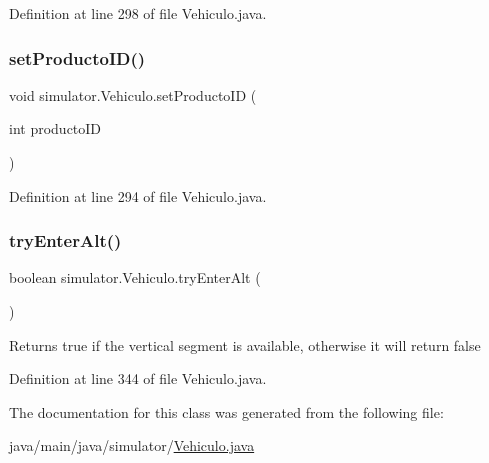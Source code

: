 Definition at line 298 of file Vehiculo.\+java.

\mbox{\label{classsimulator_1_1_vehiculo_aa917981d13bea186e4016a9a367c8288}} 
\subsubsection{\texorpdfstring{set\+Producto\+I\+D()}{setProductoID()}}
{\footnotesize\ttfamily void simulator.\+Vehiculo.\+set\+Producto\+ID (\begin{DoxyParamCaption}\item[{int}]{producto\+ID }\end{DoxyParamCaption})}



Definition at line 294 of file Vehiculo.\+java.

\mbox{\label{classsimulator_1_1_vehiculo_a74f78a4942efa75589834e4ad4e95fc4}} 
\subsubsection{\texorpdfstring{try\+Enter\+Alt()}{tryEnterAlt()}}
{\footnotesize\ttfamily boolean simulator.\+Vehiculo.\+try\+Enter\+Alt (\begin{DoxyParamCaption}{ }\end{DoxyParamCaption})}

\begin{DoxyReturn}{Returns}
true if the vertical segment is available, otherwise it will return false 
\end{DoxyReturn}


Definition at line 344 of file Vehiculo.\+java.



The documentation for this class was generated from the following file\+:\begin{DoxyCompactItemize}
\item 
java/main/java/simulator/\mbox{\hyperlink{_vehiculo_8java}{Vehiculo.\+java}}\end{DoxyCompactItemize}
